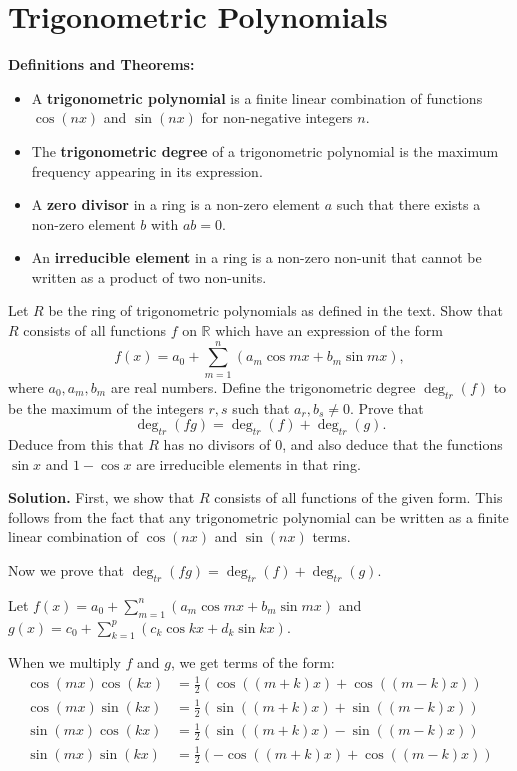 \section{Trigonometric Polynomials}

\noindent\textbf{Definitions and Theorems:}
\begin{itemize}
\item A \textbf{trigonometric polynomial} is a finite linear combination of functions $\cos(nx)$ and $\sin(nx)$ for non-negative integers $n$.
\item The \textbf{trigonometric degree} of a trigonometric polynomial is the maximum frequency appearing in its expression.
\item A \textbf{zero divisor} in a ring is a non-zero element $a$ such that there exists a non-zero element $b$ with $ab = 0$.
\item An \textbf{irreducible element} in a ring is a non-zero non-unit that cannot be written as a product of two non-units.
\end{itemize}

\begin{problembox}
Let $R$ be the ring of trigonometric polynomials as defined in the text. Show that $R$ consists of all functions $f$ on $\mathbb{R}$ which have an expression of the form
\[ f(x) = a_0 + \sum_{m=1}^n (a_m \cos mx + b_m \sin mx), \]
where $a_0, a_m, b_m$ are real numbers. Define the trigonometric degree $\deg_{tr}(f)$ to be the maximum of the integers $r, s$ such that $a_r, b_s \neq 0$. Prove that
\[ \deg_{tr}(fg) = \deg_{tr}(f) + \deg_{tr}(g). \]
Deduce from this that $R$ has no divisors of $0$, and also deduce that the functions $\sin x$ and $1 - \cos x$ are irreducible elements in that ring.
\end{problembox}

\noindent\textbf{Solution.}
First, we show that $R$ consists of all functions of the given form. This follows from the fact that any trigonometric polynomial can be written as a finite linear combination of $\cos(nx)$ and $\sin(nx)$ terms.

Now we prove that $\deg_{tr}(fg) = \deg_{tr}(f) + \deg_{tr}(g)$.

Let $f(x) = a_0 + \sum_{m=1}^n (a_m \cos mx + b_m \sin mx)$ and $g(x) = c_0 + \sum_{k=1}^p (c_k \cos kx + d_k \sin kx)$.

When we multiply $f$ and $g$, we get terms of the form:
\begin{align*}
\cos(mx) \cos(kx) &= \frac{1}{2}(\cos((m+k)x) + \cos((m-k)x)) \\
\cos(mx) \sin(kx) &= \frac{1}{2}(\sin((m+k)x) + \sin((m-k)x)) \\
\sin(mx) \cos(kx) &= \frac{1}{2}(\sin((m+k)x) - \sin((m-k)x)) \\
\sin(mx) \sin(kx) &= \frac{1}{2}(-\cos((m+k)x) + \cos((m-k)x))
\end{align*}

